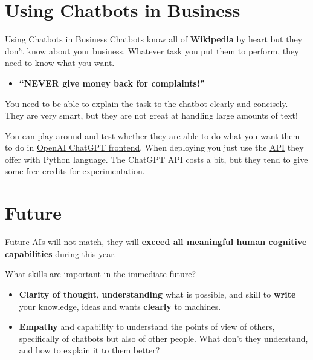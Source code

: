 \documentclass{beamer}
\begin{document}
\section{Using Chatbots in Business}
\begin{frame}{Using Chatbots in Business}
Chatbots know all of \textbf{Wikipedia} by heart but they don't know about your business. Whatever task you put them to perform, they need to know what you want.
  \begin{itemize}
    \item \textbf{``NEVER give money back for complaints!''}
  \end{itemize}
You need to be able to explain the task to the chatbot clearly and concisely. They are very smart, but they are not great at handling large amounts of text!

\vspace{0.5cm}

You can play around and test whether they are able to do what you want them to do in \textcolor{blue}{\href{https://chat.openai.com}{OpenAI ChatGPT frontend}}. When deploying you just use the \textcolor{blue}{\href{https://platform.openai.com/overview}{API}} they offer with Python language. The ChatGPT API costs a bit, but they tend to give some free credits for experimentation.
\end{frame}

\section{Future}
\begin{frame}{Future}
AIs will not match, they will \textbf{exceed all meaningful human cognitive capabilities} during this year.

What skills are important in the immediate future?
  \begin{itemize}
    \item \textbf{Clarity of thought}, \textbf{understanding} what is possible, and skill to \textbf{write} your knowledge, ideas and wants \textbf{clearly} to machines.
    \item \textbf{Empathy} and capability to understand the points of view of others, specifically of chatbots but also of other people. What don't they understand, and how to explain it to them better?
  \end{itemize}
\end{frame}
\end{document}
